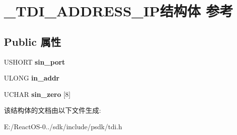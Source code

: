 \hypertarget{struct___t_d_i___a_d_d_r_e_s_s___i_p}{}\section{\+\_\+\+T\+D\+I\+\_\+\+A\+D\+D\+R\+E\+S\+S\+\_\+\+I\+P结构体 参考}
\label{struct___t_d_i___a_d_d_r_e_s_s___i_p}
\subsection*{Public 属性}
\begin{DoxyCompactItemize}
\item 
\mbox{\label{struct___t_d_i___a_d_d_r_e_s_s___i_p_aea8105f63b6c5f9848783ad2eb7084f4}} 
U\+S\+H\+O\+RT {\bfseries sin\+\_\+port}
\item 
\mbox{\label{struct___t_d_i___a_d_d_r_e_s_s___i_p_aac80670ce8568a90e86d117ba5873460}} 
U\+L\+O\+NG {\bfseries in\+\_\+addr}
\item 
\mbox{\label{struct___t_d_i___a_d_d_r_e_s_s___i_p_af3f90ea0fe9f3efee75361b130be2dea}} 
U\+C\+H\+AR {\bfseries sin\+\_\+zero} \mbox{[}8\mbox{]}
\end{DoxyCompactItemize}


该结构体的文档由以下文件生成\+:\begin{DoxyCompactItemize}
\item 
E\+:/\+React\+O\+S-\/0../sdk/include/psdk/tdi.\+h\end{DoxyCompactItemize}
